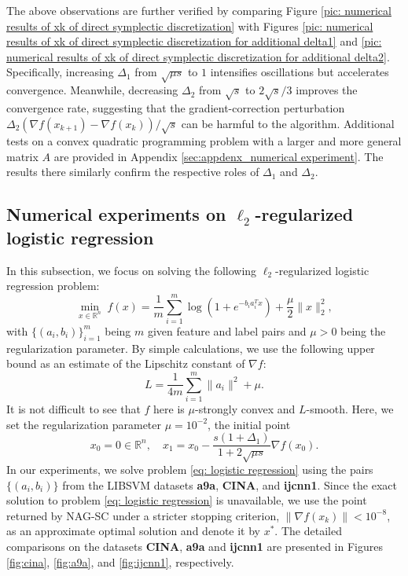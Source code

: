 \documentclass[11pt]{article}
\newcommand{\1}{\mathbf 1}
\numberwithin{equation}{section}
\begin{document}
The above observations are further verified by comparing Figure  
\ref{pic: numerical results of xk of direct symplectic discretization} with Figures \ref{pic: numerical results of xk of direct symplectic discretization for additional delta1} and \ref{pic: numerical results of xk of direct symplectic discretization for additional delta2}. Specifically, increasing $\Delta_1$ from $\sqrt{\mu s}$ to $1$ intensifies oscillations but accelerates convergence.  Meanwhile, decreasing $\Delta_2$ from $\sqrt{s}$ to $2\sqrt{s}/3$ improves the convergence rate, suggesting that the gradient-correction perturbation $\Delta_2 (\nabla f(x_{k+1}) - \nabla f(x_k)) / \sqrt{s}$ can be harmful to the algorithm.  Additional tests on a convex quadratic programming problem with a larger and more general matrix $A$ are provided in Appendix \ref{sec:appdenx_numerical experiment}. The results there similarly confirm the respective roles of $\Delta_1$ and $\Delta_2$.



\subsection{Numerical experiments on $\ell_2$-regularized logistic regression}
\label{subsec: numerical experiments for direct symplectic discretization}
In this subsection, we focus on solving the following $\ell_2$-regularized logistic regression problem:
\begin{equation}
	\label{eq: logistic regression}
	\min\limits_{x\in\mathbb{R}^n} \; f(x)=\frac{1}{m} \sum_{i=1}^{m}\log(1+e^{-b_ia_i^Tx}) + \frac{\mu}{2} \|x\|_2^2,
\end{equation}
with $\{(a_i,b_i)\}_{i=1}^m$ being $m$ given feature and label pairs and $\mu >0$ being the regularization parameter. 
By simple calculations, we use the following upper bound as an estimate of the Lipschitz constant of $\nabla f$: 
\[ 
L = \frac{1}{4m}\sum_{i=1}^{m}\|a_i\|^2+\mu.
\]
It is not difficult to see that $f$ here is $\mu$-strongly convex and $L$-smooth.
Here, we set the regularization parameter $\mu = 10^{-2}$, the initial point 
\[x_0 = 0 \in \mathbb{R}^n, \quad x_1 = x_0 - \frac{s(1+\Delta_1)}{1+2\sqrt{\mu s}} \nabla f(x_0).\]
In our experiments, we solve problem \eqref{eq: logistic regression} using the pairs $\{(a_i, b_i)\}$ from the LIBSVM datasets {\bf a9a}, {\bf CINA}, and {\bf ijcnn1}. Since the exact solution to problem \eqref{eq: logistic regression} is unavailable, we use the point returned by NAG-SC under a stricter stopping criterion, $\|\nabla f(x_k)\| < 10^{-8}$, as an approximate optimal solution and denote it by \( x^* \). The detailed comparisons on the datasets {\bf CINA}, {\bf a9a} and {\bf ijcnn1} are presented in
Figures \ref{fig:cina}, \ref{fig:a9a}, and \ref{fig:ijcnn1}, respectively.
\end{document}
